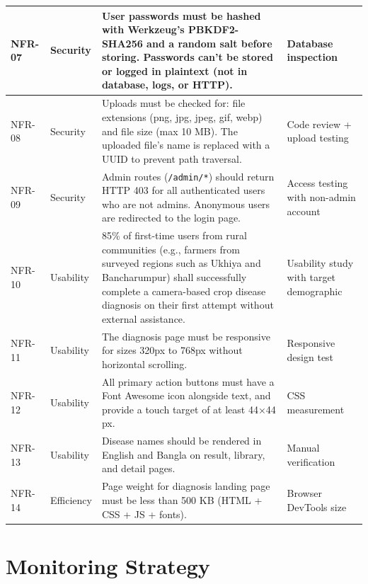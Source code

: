\documentclass[12pt,a4paper]{article}
\begin{document}
\begin{longtable}{|p{1.3cm}|p{2.3cm}|p{8cm}|p{2.5cm}|}
NFR-07 & Security &
User passwords must be hashed with Werkzeug's PBKDF2-SHA256 and a random salt before storing. Passwords can't be stored or logged in plaintext (not in database, logs, or HTTP). &
Database inspection \\
\hline

NFR-08 & Security &
Uploads must be checked for: file extensions (png, jpg, jpeg, gif, webp) and file size (max 10 MB). The uploaded file's name is replaced with a UUID to prevent path traversal. &
Code review + upload testing \\
\hline

NFR-09 & Security &
Admin routes (\texttt{/admin/*}) should return HTTP 403 for all authenticated users who are not admins. Anonymous users are redirected to the login page. &
Access testing with non-admin account \\
\hline

NFR-10 & Usability &
85\% of first-time users from rural communities (e.g., farmers from surveyed regions such as Ukhiya and Bancharumpur) shall successfully complete a camera-based crop disease diagnosis on their first attempt without external assistance. &
Usability study with target demographic \\
\hline

NFR-11 & Usability &
The diagnosis page must be responsive for sizes 320px to 768px without horizontal scrolling. &
Responsive design test \\
\hline

NFR-12 & Usability &
All primary action buttons must have a Font Awesome icon alongside text, and provide a touch target of at least 44×44 px. &
CSS measurement \\
\hline

NFR-13 & Usability &
Disease names should be rendered in English and Bangla on result, library, and detail pages. &
Manual verification \\
\hline

NFR-14 & Efficiency &
Page weight for diagnosis landing page must be less than 500 KB (HTML + CSS + JS + fonts). &
Browser DevTools size \\
\hline

\end{longtable}
\section{Monitoring Strategy}
\end{document}
